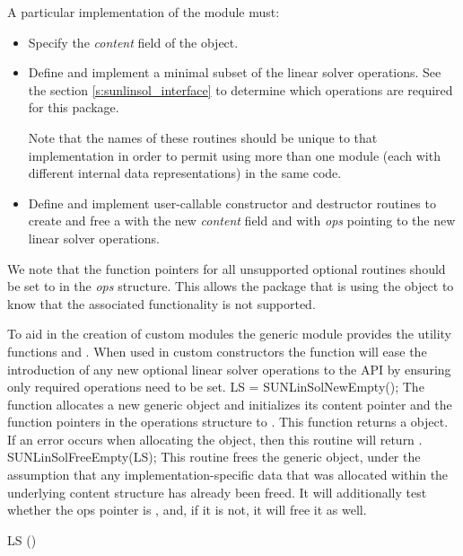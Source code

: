 A particular implementation of the {\sunlinsol} module must:
\begin{itemize}
\item Specify the {\em content} field of the  object.
\item Define and implement a minimal subset of the linear solver
  operations. See the section \ref{s:sunlinsol_interface} to determine which
  {\sunlinsol} operations are required for this {\sundials} package.

  Note that the names of these routines should be unique to that
  implementation in order to permit using more than one {\sunlinsol}
  module (each with different  internal data
  representations) in the same code.
\item Define and implement user-callable constructor and destructor
  routines to create and free a  with
  the new {\em content} field and with {\em ops} pointing to the
  new linear solver operations.
\end{itemize}

We note that the function pointers for all unsupported optional
routines should be set to  in the \emph{ops} structure.  This
allows the {\sundials} package that is using the {\sunlinsol} object
to know that the associated functionality is not supported.

To aid in the creation of custom {\sunlinsol} modules the generic {\sunlinsol}
module provides the utility functions  and .
When used in custom {\sunlinsol} constructors the function  will
ease the introduction of any new optional linear solver operations to the {\sunlinsol}
API by ensuring only required operations need to be set.
%
%
{
  LS = SUNLinSolNewEmpty();
}
{
  The function  allocates a new generic {\sunlinsol}
  object and initializes its content pointer and the function pointers in the
  operations structure to .
}
{}
{
  This function returns a  object. If an error occurs when
  allocating the object, then this routine will return .
}
{}
%
%
{
  SUNLinSolFreeEmpty(LS);
}
{
  This routine frees the generic  object, under the assumption that any
  implementation-specific data that was allocated within the underlying content structure
  has already been freed. It will additionally test whether the ops pointer is , 
  and, if it is not, it will free it as well.
}
{
  \begin{args}[LS]
  \item[LS] ()
  \end{args}
}
{}
{}


